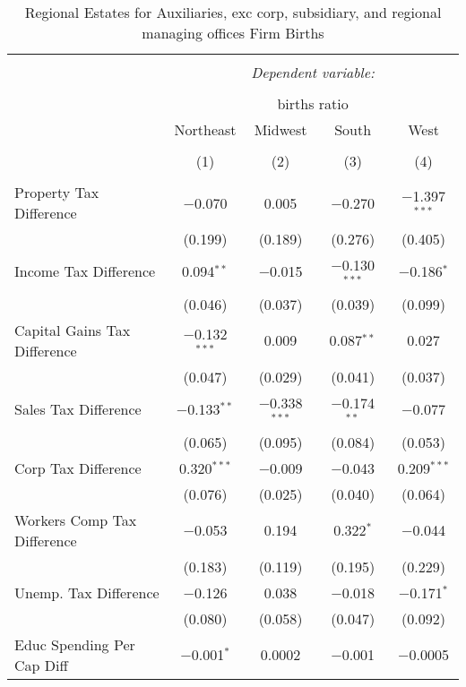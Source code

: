 
\begin{table}[!htbp] \centering 
  \caption{Regional Estates for  Auxiliaries, exc corp, subsidiary, and regional managing offices Firm Births} 
  \label{} 
\begin{tabular}{@{\extracolsep{5pt}}lcccc} 
\\[-1.8ex]\hline 
\hline \\[-1.8ex] 
 & \multicolumn{4}{c}{\textit{Dependent variable:}} \\ 
\cline{2-5} 
\\[-1.8ex] & \multicolumn{4}{c}{births ratio} \\ 
 & Northeast & Midwest & South & West \\ 
\\[-1.8ex] & (1) & (2) & (3) & (4)\\ 
\hline \\[-1.8ex] 
 Property Tax Difference & $-$0.070 & 0.005 & $-$0.270 & $-$1.397$^{***}$ \\ 
  & (0.199) & (0.189) & (0.276) & (0.405) \\ 
  Income Tax Difference & 0.094$^{**}$ & $-$0.015 & $-$0.130$^{***}$ & $-$0.186$^{*}$ \\ 
  & (0.046) & (0.037) & (0.039) & (0.099) \\ 
  Capital Gains Tax Difference & $-$0.132$^{***}$ & 0.009 & 0.087$^{**}$ & 0.027 \\ 
  & (0.047) & (0.029) & (0.041) & (0.037) \\ 
  Sales Tax Difference & $-$0.133$^{**}$ & $-$0.338$^{***}$ & $-$0.174$^{**}$ & $-$0.077 \\ 
  & (0.065) & (0.095) & (0.084) & (0.053) \\ 
  Corp Tax Difference & 0.320$^{***}$ & $-$0.009 & $-$0.043 & 0.209$^{***}$ \\ 
  & (0.076) & (0.025) & (0.040) & (0.064) \\ 
  Workers Comp Tax Difference & $-$0.053 & 0.194 & 0.322$^{*}$ & $-$0.044 \\ 
  & (0.183) & (0.119) & (0.195) & (0.229) \\ 
  Unemp. Tax Difference & $-$0.126 & 0.038 & $-$0.018 & $-$0.171$^{*}$ \\ 
  & (0.080) & (0.058) & (0.047) & (0.092) \\ 
  Educ Spending Per Cap Diff & $-$0.001$^{*}$ & 0.0002 & $-$0.001 & $-$0.0005 \\ 

\end{tabular}
\end{table}
